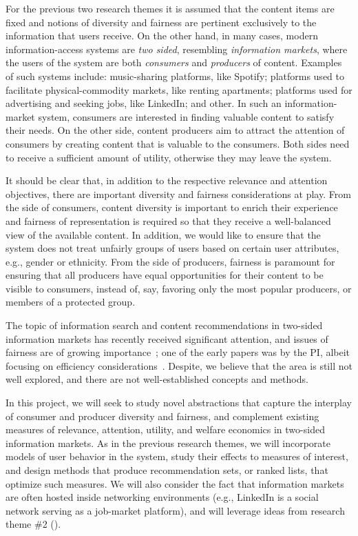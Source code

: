 \documentclass[a4paper,11pt]{article}
\begin{document}
For the previous two research themes it is assumed that the content items are fixed
and notions of diversity and fairness are pertinent exclusively to the information that users receive. 
On the other hand, in many cases, modern information-access systems are \emph{two sided},
resembling \emph{information markets}, 
where the users of the system are both \emph{consumers} and \emph{producers} of content.
Examples of such systems include:
music-sharing platforms, like Spotify;
platforms used to facilitate physical-commodity markets, like renting apartments; 
platforms used for advertising and seeking jobs, like LinkedIn; and other.
%
In such an information-market system, 
consumers are interested in finding valuable content to satisfy their needs.
On the other side, content producers aim to attract the attention of consumers 
by creating content that is valuable to the consumers.
Both sides need to receive a sufficient amount of utility, 
otherwise they may leave the system. 

It should be clear that, in addition to the respective relevance and attention objectives, 
there are important diversity and fairness considerations at play. 
From the side of consumers, 
content diversity is important to enrich their experience and
fairness of representation is required so that they receive a well-balanced
view of the available content.
In addition, we would like to ensure that the system does not treat unfairly 
groups of users based on certain user attributes, e.g., gender or ethnicity. 
From the side of producers, 
fairness is paramount for ensuring that all producers have equal opportunities
for their content to be visible to consumers, 
instead of, say, favoring only the most popular producers, 
or members of a protected group. 

The topic of information search and content recommendations in two-sided information markets 
has recently received significant attention, 
and issues of fairness are of growing importance~\cite{do2021two,wang2021user};
one of the early papers was by the PI, 
albeit focusing on efficiency considerations~\cite{gdfm2011social}.
Despite, we believe that the area is still not well explored, 
and there are not well-established concepts and methods. 

In this project, we will seek to study novel abstractions
that capture the interplay of consumer and producer diversity and fairness, 
and complement existing measures of relevance, attention, utility, 
and welfare economics in two-sided information markets.
As in the previous research themes, 
we will incorporate models of user behavior in the system, 
study their effects to measures of interest, 
and design methods that produce recommendation sets, or ranked lists, 
that optimize such measures. 
We will also consider the fact that information markets are often hosted inside networking environments
(e.g., LinkedIn is a social network serving as a job-market platform), 
and will leverage ideas from research theme \#2 (\networks).
\end{document}
